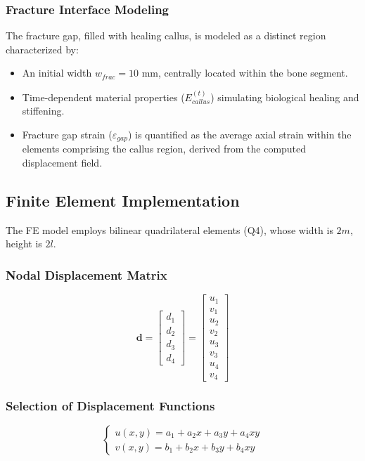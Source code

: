 \documentclass{article}
\begin{document}
\subsubsection{Fracture Interface Modeling}
The fracture gap, filled with healing callus, is modeled as a distinct region characterized by:
\begin{itemize}
  \item An initial width $w_{frac} = 10$ mm, centrally located within the bone segment.
  \item Time-dependent material properties ($E_{callus}^{(t)}$) simulating biological healing and stiffening.
  \item Fracture gap strain ($\varepsilon_{gap}$) is quantified as the average axial strain within the elements comprising the callus region, derived from the computed displacement field.
\end{itemize}

\subsection{Finite Element Implementation}

The FE model employs bilinear quadrilateral elements (Q4), whose width is $2m$, height is $2l$.

\subsubsection{Nodal Displacement Matrix}

\[
\mathbf{d} = \begin{bmatrix}
d_1 \\
d_2 \\
d_3 \\
d_4
\end{bmatrix} = \begin{bmatrix}
u_1 \\
v_1 \\
u_2 \\
v_2 \\
u_3 \\
v_3 \\
u_4 \\
v_4
\end{bmatrix}
\]

\subsubsection{Selection of Displacement Functions}

\[
\begin{cases}
u(x, y) = a_1 + a_2 x + a_3 y + a_4 xy \\
v(x, y) = b_1 + b_2 x + b_3 y + b_4 xy
\end{cases}
\]
\end{document}
